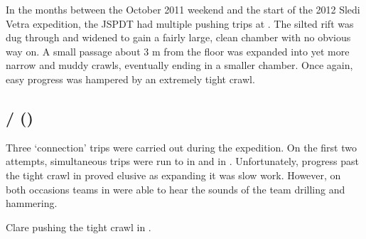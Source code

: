 In the months between the October 2011 weekend and the start of the 2012 Sledi
Vetra expedition, the JSPDT had multiple pushing trips at . The silted rift was dug through and widened to gain a fairly
large, clean chamber with no obvious way on. A small passage about 3 m
from the floor was expanded into yet more narrow and muddy crawls,
eventually ending in a smaller chamber. Once again, easy progress was
hampered by an extremely tight crawl.


\subsection{ /  ()}

Three `connection' trips were carried out during the expedition. On the
first two attempts, simultaneous trips were run to  in
 and  in . Unfortunately,
progress past the tight crawl in  proved elusive as
expanding it was slow work. However, on both occasions teams in
 were able to hear the sounds of the  team
drilling and hammering.

\begin{marginfigure}
\checkoddpage \ifoddpage \forcerectofloat \else \forceversofloat \fi
\centering
 \caption{Clare pushing the tight crawl in . }
 \label{m2 crawl}
\end{marginfigure}

